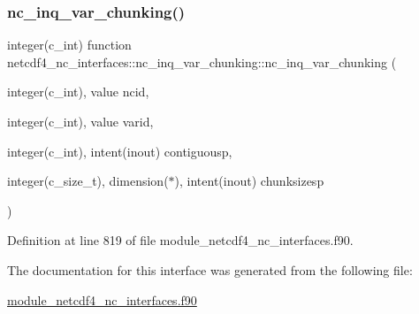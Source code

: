 \subsubsection{\texorpdfstring{nc\+\_\+inq\+\_\+var\+\_\+chunking()}{nc\_inq\_var\_chunking()}}
{\footnotesize\ttfamily integer(c\+\_\+int) function netcdf4\+\_\+nc\+\_\+interfaces\+::nc\+\_\+inq\+\_\+var\+\_\+chunking\+::nc\+\_\+inq\+\_\+var\+\_\+chunking (\begin{DoxyParamCaption}\item[{integer(c\+\_\+int), value}]{ncid,  }\item[{integer(c\+\_\+int), value}]{varid,  }\item[{integer(c\+\_\+int), intent(inout)}]{contiguousp,  }\item[{integer(c\+\_\+size\+\_\+t), dimension($\ast$), intent(inout)}]{chunksizesp }\end{DoxyParamCaption})}



Definition at line 819 of file module\+\_\+netcdf4\+\_\+nc\+\_\+interfaces.\+f90.



The documentation for this interface was generated from the following file\+:\begin{DoxyCompactItemize}
\item 
\hyperlink{module__netcdf4__nc__interfaces_8f90}{module\+\_\+netcdf4\+\_\+nc\+\_\+interfaces.\+f90}\end{DoxyCompactItemize}
